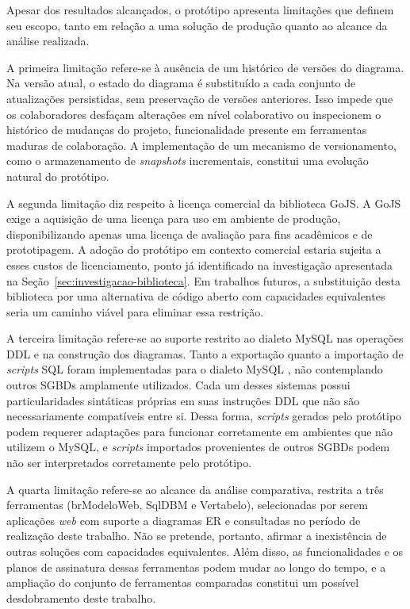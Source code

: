 Apesar dos resultados alcançados, o protótipo apresenta limitações que definem seu escopo, tanto em relação a uma solução de produção quanto ao alcance da análise realizada.

A primeira limitação refere-se à ausência de um histórico de versões do diagrama. Na versão atual, o estado do diagrama é substituído a cada conjunto de atualizações persistidas, sem preservação de versões anteriores. Isso impede que os colaboradores desfaçam alterações em nível colaborativo ou inspecionem o histórico de mudanças do projeto, funcionalidade presente em ferramentas maduras de colaboração. A implementação de um mecanismo de versionamento, como o armazenamento de \textit{snapshots} incrementais, constitui uma evolução natural do protótipo.

A segunda limitação diz respeito à licença comercial da biblioteca GoJS. A GoJS exige a aquisição de uma licença para uso em ambiente de produção, disponibilizando apenas uma licença de avaliação para fins acadêmicos e de prototipagem. A adoção do protótipo em contexto comercial estaria sujeita a esses custos de licenciamento, ponto já identificado na investigação apresentada na Seção~\ref{sec:investigacao-biblioteca}. Em trabalhos futuros, a substituição desta biblioteca por uma alternativa de código aberto com capacidades equivalentes seria um caminho viável para eliminar essa restrição.

A terceira limitação refere-se ao suporte restrito ao dialeto MySQL nas operações DDL e na construção dos diagramas. Tanto a exportação quanto a importação de \textit{scripts} SQL foram implementadas para o dialeto MySQL \cite{OracleMySQL2024}, não contemplando outros SGBDs amplamente utilizados. Cada um desses sistemas possui particularidades sintáticas próprias em suas instruções DDL que não são necessariamente compatíveis entre si. Dessa forma, \textit{scripts} gerados pelo protótipo podem requerer adaptações para funcionar corretamente em ambientes que não utilizem o MySQL, e \textit{scripts} importados provenientes de outros SGBDs podem não ser interpretados corretamente pelo protótipo.

A quarta limitação refere-se ao alcance da análise comparativa, restrita a três ferramentas (brModeloWeb, SqlDBM e Vertabelo), selecionadas por serem aplicações \textit{web} com suporte a diagramas ER e consultadas no período de realização deste trabalho. Não se pretende, portanto, afirmar a inexistência de outras soluções com capacidades equivalentes. Além disso, as funcionalidades e os planos de assinatura dessas ferramentas podem mudar ao longo do tempo, e a ampliação do conjunto de ferramentas comparadas constitui um possível desdobramento deste trabalho.

